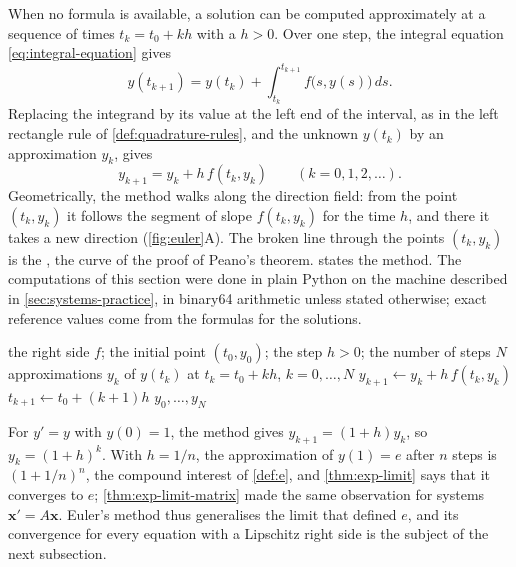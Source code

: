 When no formula is available, a solution can be computed approximately at a sequence of times $t_k=t_0+kh$ with a  $h>0$. Over one step, the integral equation \eqref{eq:integral-equation} gives
\[
y(t_{k+1})=y(t_k)+\int_{t_k}^{t_{k+1}}f\bigl(s,y(s)\bigr)\,ds .
\]
Replacing the integrand by its value at the left end of the interval, as in the left rectangle rule of \cref{def:quadrature-rules}, and the unknown $y(t_k)$ by an approximation $y_k$, gives 
\begin{equation}
y_{k+1}=y_k+h\,f(t_k,y_k)\qquad(k=0,1,2,\ldots).
\label{eq:euler-method}
\end{equation}
Geometrically, the method walks along the direction field: from the point $(t_k,y_k)$ it follows the segment of slope $f(t_k,y_k)$ for the time $h$, and there it takes a new direction (\cref{fig:euler}A). The broken line through the points $(t_k,y_k)$ is the , the curve of the proof of Peano's theorem.  states the method. The computations of this section were done in plain Python on the machine described in \cref{sec:systems-practice}, in binary64 arithmetic unless stated otherwise; exact reference values come from the formulas for the solutions.

\begin{algorithm}
\begin{algorithmic}[1]
\Require the right side $f$; the initial point $(t_0,y_0)$; the step $h>0$; the number of steps $N$
\Ensure approximations $y_k$ of $y(t_k)$ at $t_k=t_0+kh$, $k=0,\ldots,N$
  \State $y_{k+1}\gets y_k+h\,f(t_k,y_k)$ 
  \State $t_{k+1}\gets t_0+(k+1)h$
\EndFor
\State \Return $y_0,\ldots,y_N$
\end{algorithmic}
\caption{Euler's method for the initial value problem $y'=f(t,y)$, $y(t_0)=y_0$. Each step costs one evaluation of $f$. The times are computed as $t_0+(k+1)h$, which avoids the accumulation of rounding errors that repeated addition of $h$ would cause.\label{alg:euler}}
\end{algorithm}

For $y'=y$ with $y(0)=1$, the method gives $y_{k+1}=(1+h)y_k$, so $y_k=(1+h)^k$. With $h=1/n$, the approximation of $y(1)=e$ after $n$ steps is $(1+1/n)^n$, the compound interest of \cref{def:e}, and \cref{thm:exp-limit} says that it converges to $e$; \cref{thm:exp-limit-matrix} made the same observation for systems $\mathbf x'=A\mathbf x$. Euler's method thus generalises the limit that defined $e$, and its convergence for every equation with a Lipschitz right side is the subject of the next subsection.

